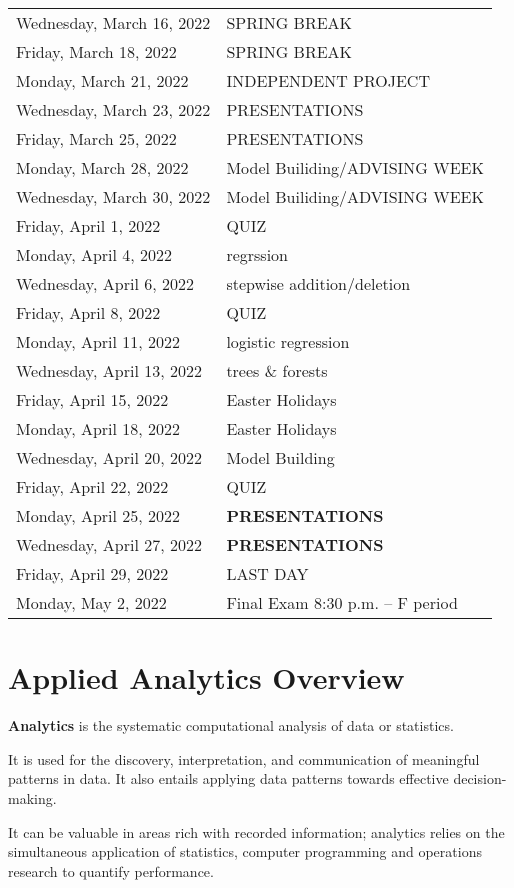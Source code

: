 \documentclass[
]{book}
\theoremstyle{definition}
\theoremstyle{definition}
\theoremstyle{definition}
\theoremstyle{definition}
\theoremstyle{remark}
\begin{document}
\begin{longtable}[]{@{}ll@{}}
Wednesday, March 16, 2022 & SPRING BREAK \\
Friday, March 18, 2022 & SPRING BREAK \\
Monday, March 21, 2022 & INDEPENDENT PROJECT \\
Wednesday, March 23, 2022 & PRESENTATIONS \\
Friday, March 25, 2022 & PRESENTATIONS \\
Monday, March 28, 2022 & Model Builiding/ADVISING WEEK \\
Wednesday, March 30, 2022 & Model Builiding/ADVISING WEEK \\
Friday, April 1, 2022 & QUIZ \\
Monday, April 4, 2022 & regrssion \\
Wednesday, April 6, 2022 & stepwise addition/deletion \\
Friday, April 8, 2022 & QUIZ \\
Monday, April 11, 2022 & logistic regression \\
Wednesday, April 13, 2022 & trees \& forests \\
Friday, April 15, 2022 & Easter Holidays \\
Monday, April 18, 2022 & Easter Holidays \\
Wednesday, April 20, 2022 & Model Building \\
Friday, April 22, 2022 & QUIZ \\
Monday, April 25, 2022 & \textbf{PRESENTATIONS} \\
Wednesday, April 27, 2022 & \textbf{PRESENTATIONS} \\
Friday, April 29, 2022 & LAST DAY \\
Monday, May 2, 2022 & Final Exam 8:30 p.m. -- F period \\
\bottomrule
\end{longtable}

\hypertarget{applied-analytics-overview}{%
\chapter{Applied Analytics Overview}\label{applied-analytics-overview}}

\textbf{Analytics} is the systematic computational analysis of data or statistics.

It is used for the discovery, interpretation, and communication of meaningful patterns in data. It also entails applying data patterns towards effective decision-making.

It can be valuable in areas rich with recorded information; analytics relies on the simultaneous application of statistics, computer programming and operations research to quantify performance.
\end{document}
